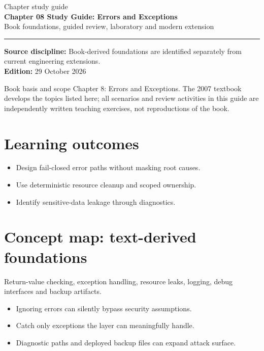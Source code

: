 \documentclass[10pt,letterpaper]{article}
\begin{document}
\hypersetup{pageanchor=false}%
\begin{titlepage}
\vspace*{1.0in}
{\color{bluegray}\Large Chapter study guide}\\[1.0em]
{\color{navy}\Huge\bfseries Chapter 08 Study Guide: Errors and Exceptions}\\[0.7em]
{\Large Book foundations, guided review, laboratory and modern extension}\\[2.0em]
\rule{\linewidth}{1.0pt}
\vfill
\textbf{Source discipline:} Book-derived foundations are identified separately from current engineering extensions.\\
\textbf{Edition:} 29 October 2026
\end{titlepage}\hypersetup{pageanchor=true}
\tableofcontents
\clearpage
\begin{focusbox}{Book basis and scope}
Chapter 8: Errors and Exceptions. The 2007 textbook develops the topics listed here; all scenarios and review activities in this guide are independently written teaching exercises, not reproductions of the book.\end{focusbox}
\section{Learning outcomes}
\begin{itemize}
\item Design fail-closed error paths without masking root causes.
\item Use deterministic resource cleanup and scoped ownership.
\item Identify sensitive-data leakage through diagnostics.
\end{itemize}

\section{Concept map: text-derived foundations}
Return-value checking, exception handling, resource leaks, logging, debug interfaces and backup artifacts.
\begin{itemize}
\item Ignoring errors can silently bypass security assumptions.
\item Catch only exceptions the layer can meaningfully handle.
\item Diagnostic paths and deployed backup files can expand attack surface.
\end{itemize}
\end{document}
